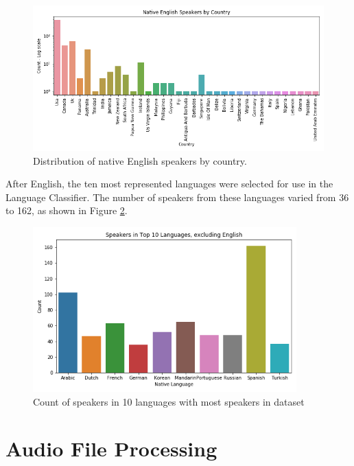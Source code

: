 \begin{figure}[h]
\begin{center}
\includegraphics[width=6in]{EnglishCountry.png}
\caption{Distribution of native English speakers by country.}
\label{fig:EnglishCountry}
\end{center}
\end{figure}

After English, the ten most represented languages were selected for use in the Language Classifier. The number of speakers from these languages varied from 36 to 162, as shown in Figure \ref{fig:LangDistTop}.

\begin{figure}[h]
\begin{center}
\includegraphics[width=4in]{TopLangCount.png}
\caption{Count of speakers in 10 languages with most speakers in dataset}
\label{fig:LangDistTop}
\end{center}
\end{figure}

\section{Audio File Processing}

